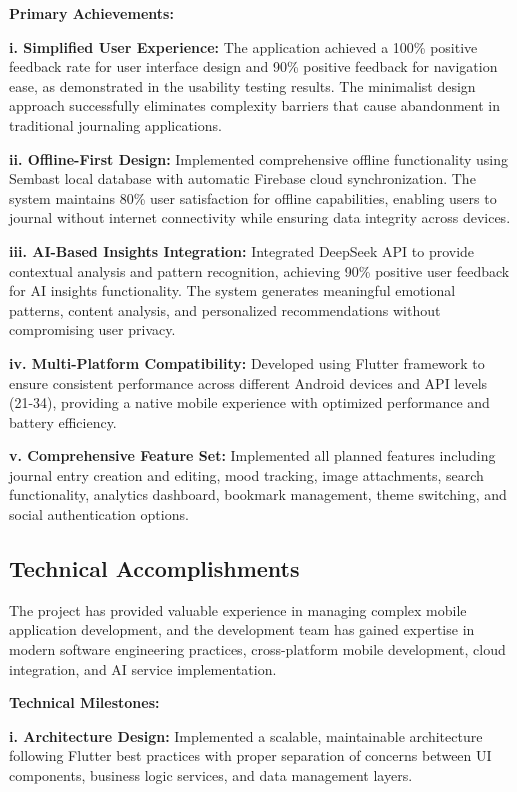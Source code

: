 \textbf{Primary Achievements:}

\textbf{i. Simplified User Experience:} The application achieved a 100\% positive feedback rate for user interface design and 90\% positive feedback for navigation ease, as demonstrated in the usability testing results. The minimalist design approach successfully eliminates complexity barriers that cause abandonment in traditional journaling applications.

\textbf{ii. Offline-First Design:} Implemented comprehensive offline functionality using Sembast local database with automatic Firebase cloud synchronization. The system maintains 80\% user satisfaction for offline capabilities, enabling users to journal without internet connectivity while ensuring data integrity across devices.

\textbf{iii. AI-Based Insights Integration:} Integrated DeepSeek API to provide contextual analysis and pattern recognition, achieving 90\% positive user feedback for AI insights functionality. The system generates meaningful emotional patterns, content analysis, and personalized recommendations without compromising user privacy.

\textbf{iv. Multi-Platform Compatibility:} Developed using Flutter framework to ensure consistent performance across different Android devices and API levels (21-34), providing a native mobile experience with optimized performance and battery efficiency.

\textbf{v. Comprehensive Feature Set:} Implemented all planned features including journal entry creation and editing, mood tracking, image attachments, search functionality, analytics dashboard, bookmark management, theme switching, and social authentication options.

\subsection{Technical Accomplishments}

The project has provided valuable experience in managing complex mobile application development, and the development team has gained expertise in modern software engineering practices, cross-platform mobile development, cloud integration, and AI service implementation.

\textbf{Technical Milestones:}

\textbf{i. Architecture Design:} Implemented a scalable, maintainable architecture following Flutter best practices with proper separation of concerns between UI components, business logic services, and data management layers.

